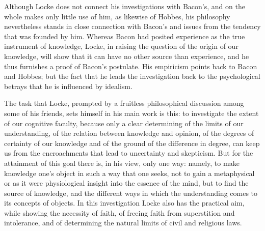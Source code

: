 \divrule

Although Locke does not connect his investigations with Bacon's, and
on the whole makes only little use of him, as likewise of Hobbes, his
philosophy nevertheless stands in close connection with Bacon's and
issues from the tendency that was founded by him. Whereas Bacon had
posited experience as the true instrument of knowledge, Locke, in
raising the question of the origin of our knowledge, will show that it
can have no other source than experience, and he thus furnishes a proof
of Bacon's postulate. His empiricism points back to Bacon and Hobbes;
but the fact that he leads the investigation back to the psychological
betrays that he is influenced by idealism.

The task that Locke, prompted by a fruitless philosophical discussion
among some of his friends, sets himself in his main work is this: to
investigate the extent of our cognitive faculty, because only a clear
determining of the limits of our understanding, of the relation between
knowledge and opinion, of the degrees of certainty of our knowledge and
of the ground of the difference in degree, can keep us from the
encroachments that lead to uncertainty and skepticism. But for the
attainment of this goal there is, in his view, only one way: namely, to
make knowledge one's object in such a way that one seeks, not to gain a
metaphysical or as it were physiological insight into the essence of
the mind, but to find the source of knowledge, and the
different ways in which the understanding comes to its concepts of
objects. In this investigation Locke also has the practical aim, while
showing the necessity of faith, of freeing faith from superstition and
intolerance, and of determining the natural limits of civil and
religious laws.


